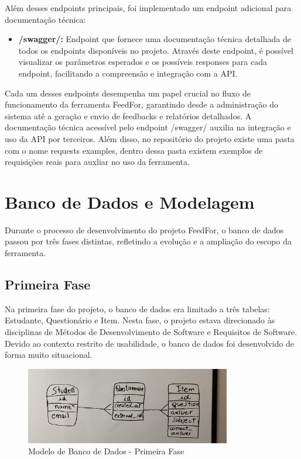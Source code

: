 Além desses endpoints principais, foi implementado um endpoint adicional para documentação técnica:

\begin{itemize}
    \item \textbf{/swagger/:} Endpoint que fornece uma documentação técnica detalhada de todos os endpoints disponíveis no projeto. Através deste endpoint, é possível visualizar os parâmetros esperados e os possíveis responses para cada endpoint, facilitando a compreensão e integração com a API.
\end{itemize}

Cada um desses endpoints desempenha um papel crucial no fluxo de funcionamento da ferramenta FeedFor, garantindo desde a administração do sistema até a geração e envio de feedbacks e relatórios detalhados. A documentação técnica acessível pelo endpoint /swagger/ auxilia na integração e uso da API por terceiros. Além disso, no repositório do projeto existe uma pasta com o nome requests examples, dentro dessa pasta existem exemplos de requisições reais para auxliar no uso da ferramenta.

\section{Banco de Dados e Modelagem}

Durante o processo de desenvolvimento do projeto FeedFor, o banco de dados passou por três fases distintas, refletindo a evolução e a ampliação do escopo da ferramenta.

\subsection{Primeira Fase}

Na primeira fase do projeto, o banco de dados era limitado a três tabelas: Estudante, Questionário e Item. Nesta fase, o projeto estava direcionado às disciplinas de Métodos de Desenvolvimento de Software e Requisitos de Software. Devido ao contexto restrito de usabilidade, o banco de dados foi desenvolvido de forma muito situacional.

\begin{figure}[H]
    \centering
    \includegraphics[width=0.8\textwidth]{figuras/bd-phase1.jpeg}
    \caption{Modelo de Banco de Dados - Primeira Fase}
    \label{fig:first_phase}
\end{figure}

